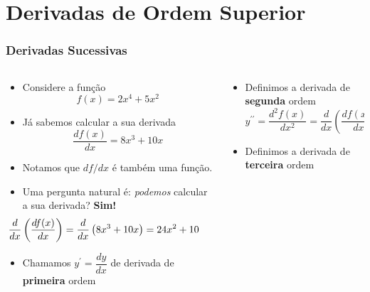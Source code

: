 \section{Derivadas de Ordem Superior}
\begin{frame}
  \frametitle{Derivadas Sucessivas}
  \begin{columns}[onlytextwidth]
    \begin{column}{0.5\textwidth}\vspace{-0.5cm}
      \begin{itemize}\small
        \item Considere a função
        \begin{equation*}
          f(x) = 2x^{4} + 5x^{2}
        \end{equation*}
        \item Já sabemos calcular a sua derivada
        \begin{equation*}
          \frac{df(x)}{dx} = 8x^{3} + 10x
        \end{equation*}
        \item Notamos que $df/dx$ é também uma função. 
        \item Uma pergunta natural é: \emph{podemos} calcular a sua derivada? \textbf{Sim!}
        \begin{equation*}\hspace*{-1.0cm}
          \frac{d}{dx}\left( \frac{df(x)}{dx} \right) = \frac{d}{dx}\left( 8x^{3} + 10x \right) = 24x^{2} + 10
        \end{equation*}
        \item Chamamos $y^{\prime} = \dfrac{dy}{dx}$ de derivada de \textbf{primeira} ordem
      \end{itemize}
    \end{column}
    \begin{column}{0.5\textwidth}\vspace{-0.5cm}
      \begin{itemize}\small
        \item Definimos a derivada de \textbf{segunda} ordem\vspace{-0.2cm}
        \begin{equation*}
          y^{\prime\prime} = \frac{d^{2}f(x)}{dx^{2}} = \frac{d}{dx}\left( \frac{df(x)}{dx} \right)
        \end{equation*}
        \item Definimos a derivada de \textbf{terceira} ordem\vspace{-0.2cm}
        \begin{equation*}

\end{equation*}
\end{itemize}
\end{column}
\end{columns}
\end{frame}
